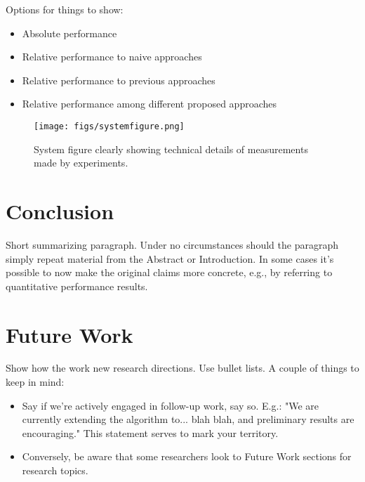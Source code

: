 \documentclass{article}
\begin{document}
Options for things to show:
\begin{itemize}
    \item Absolute performance
    \item Relative performance to naive approaches
    \item Relative performance to previous approaches
    \item Relative performance among different proposed approaches
\end{itemize}

\begin{figure}[h]
\centering
\begin{minipage}{0.3\linewidth}
    \centering
    \texttt{[image: figs/systemfigure.png]} 
\end{minipage}
\caption{System figure clearly showing technical details of measurements made by experiments.}
\label{fig:system}
\end{figure}


\section{Conclusion}
\label{conclusion}

Short summarizing paragraph. Under no circumstances should the paragraph simply repeat material from the Abstract or Introduction. In some cases it's possible to now make the original claims more concrete, e.g., by referring to quantitative performance results.


\section{Future Work}

Show how the work new research directions. Use bullet lists. A couple of things to keep in mind:

\begin{itemize}
    \item Say if we're actively engaged in follow-up work, say so. E.g.: "We are currently extending the algorithm to... blah blah, and preliminary results are encouraging." This statement serves to mark your territory.

    \item Conversely, be aware that some researchers look to Future Work sections for research topics. 
\end{itemize}
\end{document}
